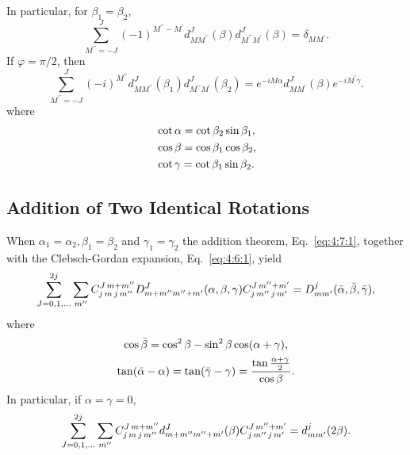 In particular, for $\beta_{1}=\beta_{2}$,
\begin{equation}
\sum_{M^{\prime \prime}=-J}^{J}(-1)^{M^{\prime \prime}-M^{\prime}} d_{M M^{\prime \prime}}^{J}(\beta) d_{M^{\prime \prime} M^{\prime}}^{J}(\beta)=\delta_{M M^{\prime}}. \label{eq:4:7:10}
\end{equation}
If $\varphi=\pi / 2$, then
\begin{equation}
\sum_{M^{\prime \prime}=-J}^{J}(-i)^{M^{\prime \prime}} d_{M M^{\prime \prime}}^{J}\left(\beta_{1}\right) d_{M^{\prime \prime} M^{\prime}}^{J}\left(\beta_{2}\right)=e^{-i M \alpha} d_{M M^{\prime}}^{J}(\beta) e^{-i M^{\prime} \gamma}. \label{eq:4:7:11}
\end{equation}
where
\begin{align}
& \cot \alpha=\cot \beta_{2} \sin \beta_{1} , \notag\\
& \cos \beta=\cos \beta_{1} \cos \beta_{2}  ,\label{eq:4:7:12}\\
& \cot \gamma=\cot \beta_{1} \sin \beta_{2} .\notag
\end{align}
\subsection{Addition of Two Identical Rotations}\label{sec:4.7.3}
When $\alpha_{1}=\alpha_{2}, \beta_{1}=\beta_{2}$ and $\gamma_{1}=\gamma_{2}$ the addition theorem, Eq.~\eqref{eq:4:7:1}, together with the Clebsch-Gordan expansion, Eq.~\eqref{eq:4:6:1}, yield
\begin{equation}
\sum_{J=0,1, \ldots}^{2 j} \sum_{m^{\prime \prime}} C_{j\,m\,j\,m^{\prime \prime}}^{J\,m+m^{\prime \prime}} D_{m+m^{\prime \prime} m^{\prime \prime}+m^{\prime}}^{J}(\alpha, \beta, \gamma) C_{j\,m^{\prime \prime}\,j\,m^{\prime}}^{J\,m^{\prime \prime}+m^{\prime}}=D_{m m^{\prime}}^{j}(\bar{\alpha}, \bar{\beta}, \bar{\gamma}) ,\label{eq:4:7:13}
\end{equation}
where
\begin{gather}
\cos \bar{\beta}=\cos ^{2} \beta-\sin ^{2} \beta \cos (\alpha+\gamma)  ,\notag\\
\tan (\bar{\alpha}-\alpha)=\tan (\bar{\gamma}-\gamma)=\frac{\tan \frac{\alpha+\gamma}{2}}{\cos \beta} .\label{eq:4:7:14}
\end{gather}
In particular, if $\alpha=\gamma=0$,
\begin{equation}
\sum_{J=0,1, \ldots}^{2 j} \sum_{m^{\prime \prime}} C_{j\,m\,j\,m^{\prime \prime}}^{J\,m+m^{\prime \prime}} d_{m+m^{\prime \prime} m^{\prime \prime}+m^{\prime}}^{J}(\beta) C_{j\,m^{\prime \prime}\,j\,m^{\prime}}^{J\,m^{\prime \prime}+m^{\prime}}=d_{m m^{\prime}}^{j}(2 \beta) .\label{eq:4:7:15}
\end{equation}
